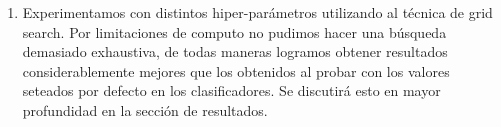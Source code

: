 \begin{enumerate}
\item Experimentamos con distintos hiper-parámetros utilizando al técnica de grid search. Por limitaciones de computo no pudimos hacer una búsqueda demasiado exhaustiva, de todas maneras logramos obtener resultados considerablemente mejores que los obtenidos al probar con los valores seteados por defecto en los clasificadores. Se discutirá esto en mayor profundidad en la sección de resultados.

\end{enumerate}